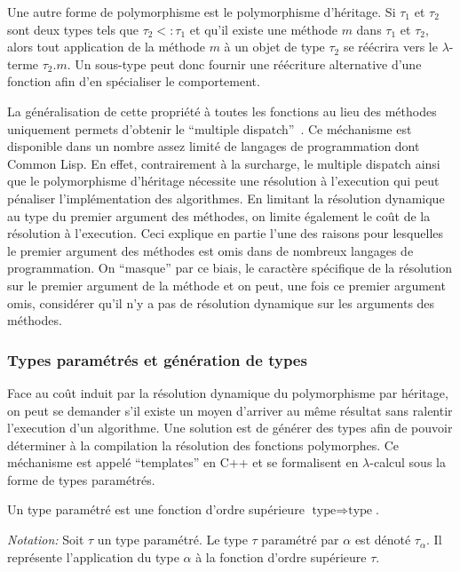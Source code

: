 Une autre forme de polymorphisme est le polymorphisme d'héritage. Si
$\tau_1$ et $\tau_2$ sont deux types tels que $\tau_2 <: \tau_1$ et
qu'il existe une méthode $m$ dans $\tau_1$ et $\tau_2$, alors tout
application de la méthode $m$ à un objet de type $\tau_2$ se réécrira
vers le $\lambda$-terme $\tau_2.m$. Un sous-type peut donc fournir une
réécriture alternative d'une fonction afin d'en spécialiser le
comportement.

La généralisation de cette propriété à toutes les fonctions au lieu
des méthodes uniquement permets d'obtenir le ``multiple
dispatch''~\citep{Muschevici2008}. Ce méchanisme est disponible dans
un nombre assez limité de langages de programmation dont Common
Lisp. En effet, contrairement à la surcharge, le multiple dispatch
ainsi que le polymorphisme d'héritage nécessite une résolution à
l'execution qui peut pénaliser l'implémentation des algorithmes. En
limitant la résolution dynamique au type du premier argument des
méthodes, on limite également le coût de la résolution à
l'execution. Ceci explique en partie l'une des raisons pour lesquelles
le premier argument des méthodes est omis dans de nombreux langages de
programmation. On ``masque'' par ce biais, le caractère spécifique de
la résolution sur le premier argument de la méthode et on peut, une
fois ce premier argument omis, considérer qu'il n'y a pas de
résolution dynamique sur les arguments des méthodes.


\subsubsection{Types paramétrés et génération de types}

Face au coût induit par la résolution dynamique du polymorphisme par
héritage, on peut se demander s'il existe un moyen d'arriver au même
résultat sans ralentir l'execution d'un algorithme. Une solution est
de générer des types afin de pouvoir déterminer à la compilation la
résolution des fonctions polymorphes. Ce méchanisme est appelé
``templates'' en C++ et se formalisent en $\lambda$-calcul sous la
forme de types paramétrés.


\begin{mydef}\label{chap1_parametrized_type}
  Un type paramétré est une fonction d'ordre supérieure $\text{type}
  \Rightarrow \text{type}$.

  \emph{Notation:} Soit $\tau$ un type paramétré. Le type $\tau$
  paramétré par $\alpha$ est dénoté $\tau_\alpha$. Il représente
  l'application du type $\alpha$ à la fonction d'ordre supérieure
  $\tau$.
\end{mydef}

